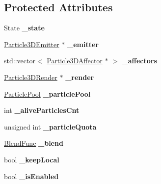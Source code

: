 \subsection*{Protected Attributes}
\begin{DoxyCompactItemize}
\item 
\mbox{\label{classParticleSystem3D_aba4a27740ad9333cb47cb588e128bdb8}} 
State {\bfseries \+\_\+state}
\item 
\mbox{\label{classParticleSystem3D_aec175ec3d98fc5706c14eb9855635615}} 
\hyperlink{classParticle3DEmitter}{Particle3\+D\+Emitter} $\ast$ {\bfseries \+\_\+emitter}
\item 
\mbox{\label{classParticleSystem3D_addaa7ff36b9c4f88fad2ca9ada85fb95}} 
std\+::vector$<$ \hyperlink{classParticle3DAffector}{Particle3\+D\+Affector} $\ast$ $>$ {\bfseries \+\_\+affectors}
\item 
\mbox{\label{classParticleSystem3D_a1ffe1d2c5abaae7b9d4ae8d73882b2bd}} 
\hyperlink{classParticle3DRender}{Particle3\+D\+Render} $\ast$ {\bfseries \+\_\+render}
\item 
\mbox{\label{classParticleSystem3D_af3422f341fa389d7c069406e87c460de}} 
\hyperlink{classDataPool}{Particle\+Pool} {\bfseries \+\_\+particle\+Pool}
\item 
\mbox{\label{classParticleSystem3D_a82244eb5165117b5d93668cfb4039569}} 
int {\bfseries \+\_\+alive\+Particles\+Cnt}
\item 
\mbox{\label{classParticleSystem3D_a24be8e2163503113e3a04ca0f326157d}} 
unsigned int {\bfseries \+\_\+particle\+Quota}
\item 
\mbox{\label{classParticleSystem3D_ac4c5d8419eb59d7f04c0ac230ef8c5a5}} 
\hyperlink{structBlendFunc}{Blend\+Func} {\bfseries \+\_\+blend}
\item 
\mbox{\label{classParticleSystem3D_a405fdc9cdd776a81c36f4bca3a6cccaa}} 
bool {\bfseries \+\_\+keep\+Local}
\item 
\mbox{\label{classParticleSystem3D_aef6364659a6c6f5201225441e49e5e5c}} 
bool {\bfseries \+\_\+is\+Enabled}
\end{DoxyCompactItemize}
